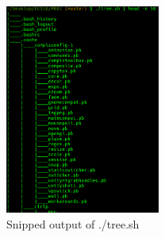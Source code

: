 \documentclass[12pt,a4paper]{article}
\begin{document}
\begin{figure}[!h]
	\centering
	\includegraphics[width=2in]{task01_output.png}
	\caption{Snipped output of ./tree.sh}
\end{figure}
\end{document}
